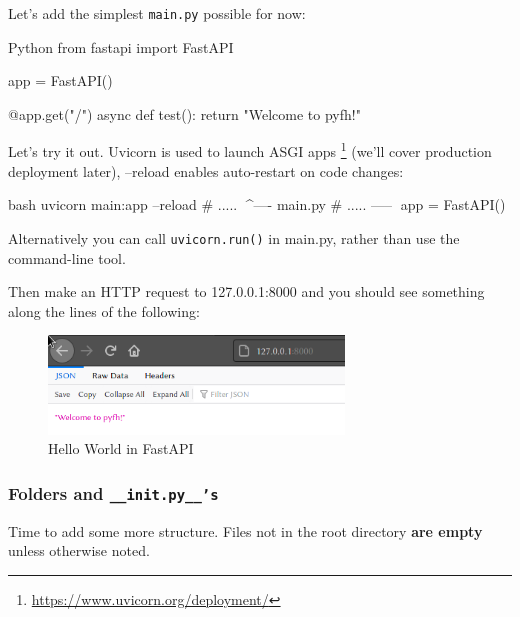 \documentclass[14pt]{extarticle}
\newcommand{\flink}[1]{\footnote{\href{#1}{#1}}}
\newcommand{\cinline}[2]{{\lstinline[language=#1, style=cstyle, basicstyle=\ttfamily\normalsize]{#2}}}
\begin{document}
Let's add the simplest \cinline{bash}{main.py} possible for now:

\begin{code}{Python}
    from fastapi import FastAPI

    app = FastAPI()

    @app.get("/")
    async def test():
    return "Welcome to pyfh!"
\end{code}

Let's try it out. Uvicorn is used to launch ASGI apps \flink{https://www.uvicorn.org/deployment/} (we'll cover production deployment later), --reload enables auto-restart on code changes:

\begin{code}{bash}
    uvicorn main:app --reload
    # ..... ^^^^---- main.py
    # ..... -----^^^ app = FastAPI()
\end{code}

Alternatively you can call \cinline{Python}{uvicorn.run()} in main.py, rather than use the command-line tool.

Then make an HTTP request to 127.0.0.1:8000 and you should see something along the lines of the following:

\begin{figure}[h]
    \centering
    \includegraphics[width=0.7\textwidth]{img/helloworld.png}
    \caption{Hello World in FastAPI}
\end{figure}

\subsubsection{Folders and \texttt{\_\_init.py\_\_'s}}

Time to add some more structure. Files not in the root directory \textbf{are empty} unless otherwise noted.
\end{document}
